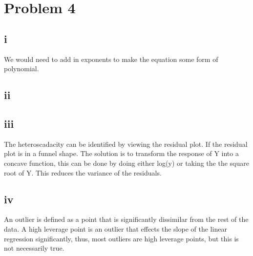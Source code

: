\documentclass{article}
\begin{document}
\section*{Problem 4}
\subsection*{i}
We would need to add in exponents to make the equation some form of polynomial.\\
\subsection*{ii}

\subsection*{iii}
The heteroscadacity can be identified by viewing the residual plot. If the residual plot is in a funnel shape. The solution is to transform the response of Y into a concave function, this can be done by doing either log(y) or taking the the square root of Y. This reduces the variance of the residuals.\\
\subsection*{iv}
An outlier is defined as a point that is significantly dissimilar from the rest of the data. A high leverage point is an outlier that effects the slope of the linear regression significantly, thus, most outliers are high leverage points, but this is not necessarily true.\\
\end{document}
